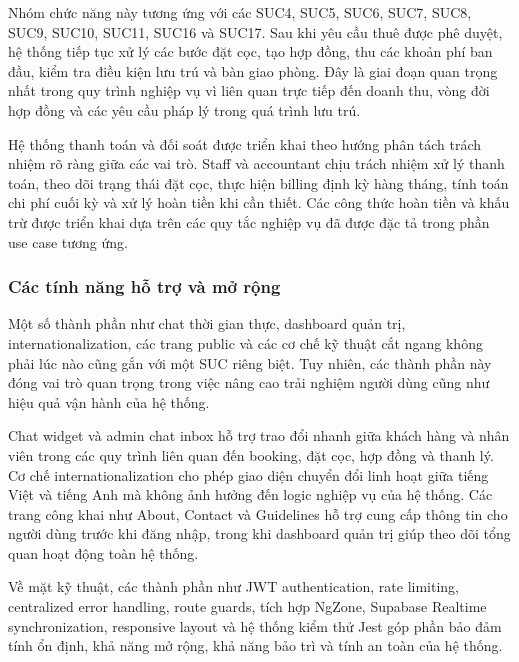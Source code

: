 Nhóm chức năng này tương ứng với các SUC4, SUC5, SUC6, SUC7, SUC8, SUC9, SUC10, SUC11, SUC16 và SUC17. Sau khi yêu cầu thuê được phê duyệt, hệ thống tiếp tục xử lý các bước đặt cọc, tạo hợp đồng, thu các khoản phí ban đầu, kiểm tra điều kiện lưu trú và bàn giao phòng. Đây là giai đoạn quan trọng nhất trong quy trình nghiệp vụ vì liên quan trực tiếp đến doanh thu, vòng đời hợp đồng và các yêu cầu pháp lý trong quá trình lưu trú.

Hệ thống thanh toán và đối soát được triển khai theo hướng phân tách trách nhiệm rõ ràng giữa các vai trò. Staff và accountant chịu trách nhiệm xử lý thanh toán, theo dõi trạng thái đặt cọc, thực hiện billing định kỳ hàng tháng, tính toán chi phí cuối kỳ và xử lý hoàn tiền khi cần thiết. Các công thức hoàn tiền và khấu trừ được triển khai dựa trên các quy tắc nghiệp vụ đã được đặc tả trong phần use case tương ứng.

\subsubsection{Các tính năng hỗ trợ và mở rộng}

Một số thành phần như chat thời gian thực, dashboard quản trị, internationalization, các trang public và các cơ chế kỹ thuật cắt ngang không phải lúc nào cũng gắn với một SUC riêng biệt. Tuy nhiên, các thành phần này đóng vai trò quan trọng trong việc nâng cao trải nghiệm người dùng cũng như hiệu quả vận hành của hệ thống.

Chat widget và admin chat inbox hỗ trợ trao đổi nhanh giữa khách hàng và nhân viên trong các quy trình liên quan đến booking, đặt cọc, hợp đồng và thanh lý. Cơ chế internationalization cho phép giao diện chuyển đổi linh hoạt giữa tiếng Việt và tiếng Anh mà không ảnh hưởng đến logic nghiệp vụ của hệ thống. Các trang công khai như About, Contact và Guidelines hỗ trợ cung cấp thông tin cho người dùng trước khi đăng nhập, trong khi dashboard quản trị giúp theo dõi tổng quan hoạt động toàn hệ thống.

Về mặt kỹ thuật, các thành phần như JWT authentication, rate limiting, centralized error handling, route guards, tích hợp NgZone, Supabase Realtime synchronization, responsive layout và hệ thống kiểm thử Jest góp phần bảo đảm tính ổn định, khả năng mở rộng, khả năng bảo trì và tính an toàn của hệ thống.